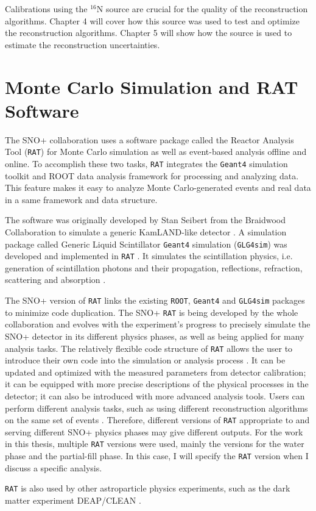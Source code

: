 Calibrations using the $^{16}$N source are crucial for the quality of the reconstruction algorithms. Chapter 4 will cover how this source was used to test and optimize the reconstruction algorithms. Chapter 5 will show how the source is used to estimate the reconstruction uncertainties.

\section{Monte Carlo Simulation and RAT Software}\label{sect:rat}

The SNO+ collaboration uses a software package called the Reactor Analysis Tool (\texttt{RAT}) for Monte Carlo simulation as well as event-based analysis offline and online. To accomplish these two tasks, \texttt{RAT} integrates the \texttt{Geant4} simulation toolkit \cite{agostinelli2003geant4} and ROOT data analysis framework \cite{brunroot} for processing and analyzing data. This feature makes it easy to analyze Monte Carlo-generated events and real data in a same framework and data structure.

The software was originally developed by Stan Seibert from the Braidwood Collaboration to simulate a generic KamLAND-like detector \cite{ratManual}. A simulation package called Generic Liquid Scintillator \texttt{Geant4} simulation (\texttt{GLG4sim}) was developed and implemented in \texttt{RAT} \cite{horton2006introduction}. It simulates the scintillation physics, i.e. generation of scintillation photons and their propagation, reflections, refraction, scattering and absorption \cite{dunger2018topological}.

The SNO+ version of \texttt{RAT} links the existing \texttt{ROOT}, \texttt{Geant4} and \texttt{GLG4sim} packages to minimize code duplication. The SNO+ \texttt{RAT} is being developed by the whole collaboration and evolves with the experiment's progress to precisely simulate the SNO+ detector in its different physics phases, as well as being applied for many analysis tasks. The relatively flexible code structure of \texttt{RAT} allows the user to introduce their own code into the simulation or analysis process \cite{ratManual}. It can be updated and optimized with the measured parameters from detector calibration; it can be equipped with more precise descriptions of the physical processes in the detector; it can also be introduced with more advanced analysis tools. Users can perform different analysis tasks, such as using different reconstruction algorithms on the same set of events \cite{ratManual}. Therefore, different versions of \texttt{RAT} appropriate to and serving different SNO+ physics phases may give different outputs. For the work in this thesis, multiple \texttt{RAT} versions were used, mainly the versions for the water phase and the partial-fill phase. In this case, I will specify the \texttt{RAT} version when I discuss a specific analysis.

\texttt{RAT} is also used by other astroparticle physics experiments, such as the dark matter experiment DEAP/CLEAN \cite{caldwell2014simulation}. 
